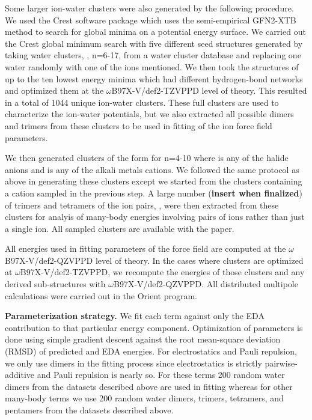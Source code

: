 \documentclass[journal=jctcce,manuscript=article]{achemso}
\begin{document}
Some larger ion-water clusters were also generated by the following procedure. We used the Crest software package\cite{pracht2020automated} which uses the semi-empirical GFN2-XTB\cite{bannwarth2019gfn2} method to search for global minima on a potential energy surface. We carried out the Crest global minimum search with five different seed structures generated by taking water clusters, , n=6-17, from a water cluster database\cite{rakshit2019atlas} and replacing one water randomly with one of the ions mentioned. We then took the structures of up to the ten lowest energy minima which had different hydrogen-bond networks and optimized them at the $\omega$B97X-V/def2-TZVPPD level of theory. This resulted in a total of 1044 unique ion-water clusters. These full clusters are used to characterize the ion-water potentials, but we also extracted all possible dimers and trimers from these clusters to be used in fitting of the ion force field parameters.

We then generated clusters of the form  for n=4-10 where  is any of the halide anions and  is any of the alkali metals cations. We followed the same protocol as above in generating these clusters except we started from the clusters containing a cation sampled in the previous step. A large number (\textbf{insert when finalized}) of trimers and tetramers of the ion pairs, , were then extracted from these clusters for analyis of many-body energies involving pairs of ions rather than just a single ion. All sampled clusters are available with the paper. 

All energies used in fitting parameters of the force field are computed at the $\omega$B97X-V/def2-QZVPPD level of theory. In the cases where clusters are optimized at $\omega$B97X-V/def2-TZVPPD, we recompute the energies of those clusters and any derived sub-structures with $\omega$B97X-V/def2-QZVPPD. All distributed multipole calculations were carried out
in the Orient program.\cite{stone2002orient}

\textbf{Parameterization strategy.} We fit each term against only the EDA contribution to that particular energy component. Optimization of parameters is done using simple gradient descent against the root mean-square deviation (RMSD) of predicted and EDA energies. For electrostatics and Pauli repulsion, we only use dimers in the fitting process since electrostatics is strictly pairwise-additive and Pauli repulsion is nearly so. For these terms 200 random water dimers from the datasets described above are used in fitting whereas for other many-body terms we use 200 random water dimers, trimers, tetramers, and pentamers from the datasets described above.
\end{document}
